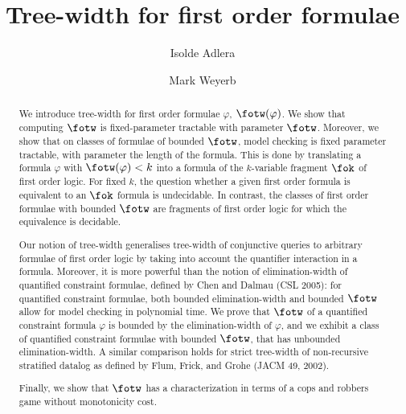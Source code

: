 \documentclass{LMCS}
\renewcommand{\phi}{\varphi}
\begin{document}
\setlength{\labelwidth}{5cm}

\title{Tree-width for first order formulae}

\author[I.~Adler]{Isolde Adler\rsuper a}
\address{{\lsuper a}Institut f\"ur Informatik, Goethe-Universit\"at Frankfurt am Main}

\author[M.~Weyer]{Mark Weyer\rsuper b}
\address{{\lsuper b}not affiliated}


\begin{abstract} 
We introduce tree-width for first order formulae $\varphi$, $\fotw(\varphi)$.
We show that computing $\fotw$ 
is fixed-parameter tractable with parameter $\fotw$.
Moreover, we show that on classes of
formulae of bounded $\fotw$, model checking is fixed parameter tractable, with
parameter the length of the formula. This is done by translating a formula
$\varphi$ with $\fotw(\varphi)<k$ into a formula of the $k$-variable
fragment $\fok$ of first order logic. For fixed $k$, 
the question whether a given first order formula is equivalent 
to an $\fok$ formula is undecidable. In contrast, 
the classes of first order formulae with bounded $\fotw$ are
fragments of first order logic for which the equivalence is decidable.

Our notion of tree-width generalises tree-width of conjunctive queries to
arbitrary formulae of first order logic by taking into account the quantifier
interaction in a formula. Moreover, it is more powerful than the notion of
elimination-width 
of quantified constraint formulae, defined by Chen and Dalmau 
(CSL 2005):
for quantified constraint formulae, both bounded elimination-width
and bounded $\fotw$ allow for model checking in polynomial time.
We prove that $\fotw$ of a quantified constraint formula $\phi$ is
bounded by the elimination-width of $\phi$, and
we exhibit a class of quantified constraint formulae
with bounded $\fotw$, that has unbounded elimination-width.
A similar comparison holds for strict tree-width of non-recursive stratified datalog 
as defined by Flum, Frick, and Grohe (JACM 49, 2002). 

Finally, we show that 
$\fotw$ has a characterization in terms of 
a cops and robbers game without monotonicity cost.
\end{abstract}
\end{document}
